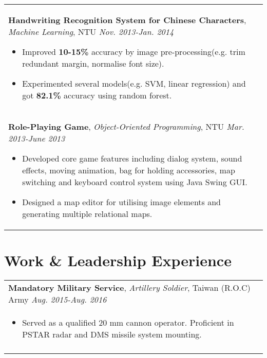 \documentclass[a4paper,10pt]{article} %
\begin{document}
{\begin{tabular}{p{16cm}}
\normalsize\textbf{Handwriting Recognition System for Chinese Characters}, {\it{Machine Learning}}, NTU  \hfill {\it Nov. 2013-Jan. 2014}
\vspace{0.5mm}
\begin{itemize}
\item Improved \textbf{10-15\%} accuracy by image pre-processing(e.g. trim redundant margin, normalise font size).
\item Experimented several models(e.g. SVM, linear regression) and got \textbf{82.1\%} accuracy using random forest.\vspace*{-\baselineskip}
\end{itemize}\\
\vspace{0.5mm}

\normalsize\textbf{Role-Playing Game}, {\it{Object-Oriented Programming}}, NTU \hfill {\it Mar. 2013-June 2013}
\vspace{0.5mm}
\begin{itemize}
\item Developed core game features including dialog system, sound effects, moving animation, bag for holding accessories, map switching and keyboard control system using Java Swing GUI.
\item Designed a map editor for utilising image elements and generating multiple relational maps.  \vspace*{-\baselineskip}
\end{itemize}\\
\end{tabular}


\section{\textbf{Work \& Leadership Experience}}

\begin{tabular}{p{16cm}}
	\normalsize\textbf{Mandatory Military Service}, {\it{Artillery Soldier}}, Taiwan (R.O.C) Army  \hfill \it Aug. 2015-Aug. 2016 \\%
\begin{itemize}
\vspace{-2mm}
\item Served as a qualified 20 mm cannon operator. Proficient in PSTAR radar and DMS missile system mounting.\vspace*{-\baselineskip}
\end{itemize} \\ 
\vspace{0.5mm}


\end{tabular}}
\end{document}
